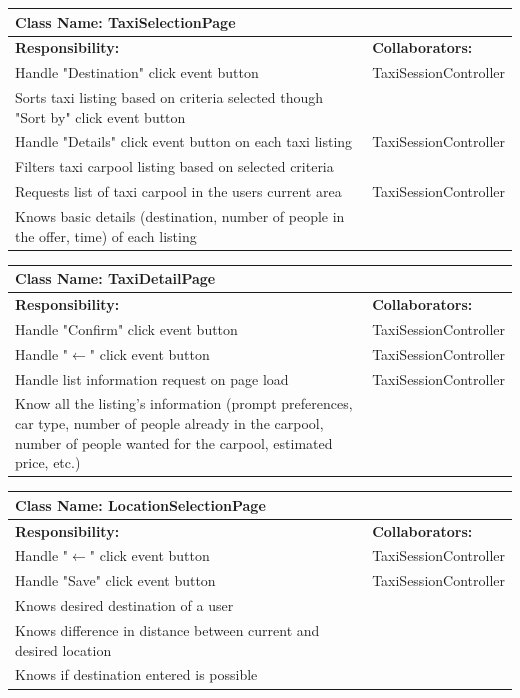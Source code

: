 \documentclass[]{article}
\begin{document}
\begin{table}[ht]
\centering
\begin{tabular}{|p{6cm}|p{6cm}|}
\hline 
 \multicolumn{2}{|l|}{\textbf{Class Name: TaxiSelectionPage}} \\
\hline
\textbf{Responsibility:} & \textbf{Collaborators:} \\
\hline
Handle "Destination" click event button & TaxiSessionController \\ \hline
Sorts taxi listing based on criteria selected though "Sort by" click event button & \\ \hline
Handle "Details" click event button on each taxi listing & TaxiSessionController \\ \hline
Filters taxi carpool listing based on selected criteria & \\ \hline
Requests list of taxi carpool in the users current area & TaxiSessionController \\ \hline
Knows basic details (destination, number of people in the offer, time) of each listing & \\ \hline
\end{tabular}
\end{table}

\begin{table}[ht]
\centering
\begin{tabular}{|p{6cm}|p{6cm}|}
\hline 
 \multicolumn{2}{|l|}{\textbf{Class Name: TaxiDetailPage}} \\
\hline
\textbf{Responsibility:} & \textbf{Collaborators:} \\
\hline
Handle "Confirm" click event button & TaxiSessionController \\ \hline
Handle "$\xleftarrow{}$" click event button & TaxiSessionController \\ \hline
Handle list information request on page load & TaxiSessionController\\ \hline
Know all the listing's information (prompt preferences, car type, number of people already in the carpool, number of people wanted for the carpool, estimated price, etc.)  & \\ \hline
\end{tabular}
\end{table}

\begin{table}[ht]
\centering
\begin{tabular}{|p{6cm}|p{6cm}|}
\hline 
 \multicolumn{2}{|l|}{\textbf{Class Name: LocationSelectionPage}} \\
\hline
\textbf{Responsibility:} & \textbf{Collaborators:} \\
\hline
Handle "$\xleftarrow{}$" click event button & TaxiSessionController \\ \hline
Handle "Save" click event button & TaxiSessionController\\ \hline
Knows desired destination of a user & \\ \hline
Knows difference in distance between current and desired location & \\ \hline
Knows if destination entered is possible & \\ \hline
\end{tabular}
\end{table}
\end{document}
